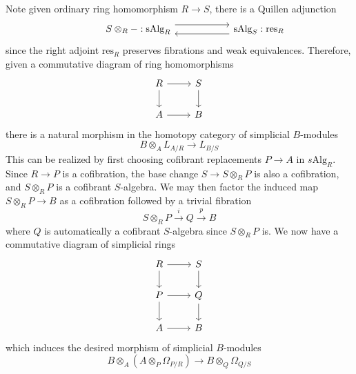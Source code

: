 \documentclass{article}
\theoremstyle{definition}
\theoremstyle{definition}
\theoremstyle{definition}
\theoremstyle{definition}
\theoremstyle{definition}
\theoremstyle{definition}
\theoremstyle{definition}
\begin{document}
Note given ordinary ring homomorphism $R\to S$, there is a Quillen adjunction 
\[\begin{tikzcd}
	{} & {S\otimes_R-:\textrm{sAlg}_R} & {} & {\textrm{sAlg}_S: \textrm{res}_R}
	\arrow[shift left=2, from=1-2, to=1-4]
	\arrow[shift left=2, from=1-4, to=1-2]
\end{tikzcd}\]
since the right adjoint $\textrm{res}_R$ preserves fibrations and weak equivalences. Therefore, given a commutative diagram of ring homomorphisms
	\[\begin{tikzcd}
	R & S \\
	A & B
	\arrow[from=1-1, to=1-2]
	\arrow[from=1-1, to=2-1]
	\arrow[from=1-2, to=2-2]
	\arrow[from=2-1, to=2-2]
\end{tikzcd}\]
there is a natural morphism in the homotopy category of simplicial $B$-modules
\[B\otimes_A L_{A/R}\to L_{B/S}\]
This can be realized by first choosing cofibrant replacements $P\to A$ in $s \textrm{Alg}_R$. Since $R\to P$ is a cofibration, the base change $S\to S\otimes_R P$ is also a cofibration, and $S\otimes_R P$ is a cofibrant $S$-algebra. We may then factor the induced map $S\otimes_R P\to B$ as a cofibration followed by a trivial fibration
\[S\otimes_R P\xrightarrow{i} Q\xrightarrow{p} B\]
where $Q$ is automatically a cofibrant $S$-algebra since $S\otimes_R P$ is. We now have a commutative diagram of simplicial rings
\[\begin{tikzcd}
	R & S \\
	P & Q \\
	A & B
	\arrow[from=1-1, to=1-2]
	\arrow[from=1-1, to=2-1]
	\arrow[from=1-2, to=2-2]
	\arrow[from=2-1, to=2-2]
	\arrow[from=2-1, to=3-1]
	\arrow[from=2-2, to=3-2]
	\arrow[from=3-1, to=3-2]
\end{tikzcd}\]
which induces the desired morphism of simplicial $B$-modules
\[B\otimes_A(A\otimes_{P} \Omega_{P/R})\to B\otimes_{Q}\Omega_{Q/S}\]
\end{document}
